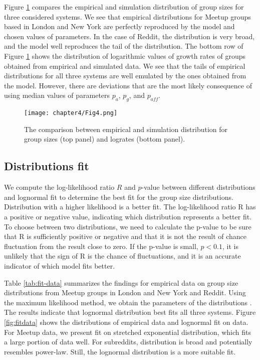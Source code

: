 Figure \ref{fig:fig6} compares the empirical and simulation distribution of group sizes for three considered systems. We see that empirical distributions for Meetup groups based in London and New York are perfectly reproduced by the model and chosen values of parameters. In the case of Reddit, the distribution is very broad, and the model well reproduces the tail of the distribution.
The bottom row of Figure \ref{fig:fig6} shows the distribution of logarithmic values of growth rates of groups obtained from empirical and simulated data. We see that the tails of empirical distributions for all three systems are well emulated by the ones obtained from the model. However, there are deviations that are the most likely consequence of using median values of parameters $p_{a}$, $p_{g}$, and $p_{aff}$.

\begin{figure}[H]
	\centering
	\texttt{[image: chapter4/Fig4.png]}
	\caption[The comparison between empirical and simulated data.]{The comparison between empirical and simulation distribution for group sizes (top panel) and logrates (bottom panel).}
	\label{fig:fig6}
\end{figure}


\subsection{Distributions fit}

We compute the log-likelihood ratio $R$ and $p$-value between different distributions and lognormal fit \cite{clauset2009power} to determine the best fit for the group size distributions. Distribution with a higher likelihood is a better fit. The log-likelihood ratio R has a positive or negative value, indicating which distribution represents a better fit. To choose between two distributions, we need to calculate the p-value to be sure that R is sufficiently positive or negative and that it is not the result of chance fluctuation from the result close to zero. If the p-value is small, $p<0.1$, it is unlikely that the sign of R is the chance of fluctuations, and it is an accurate indicator of which model fits better.

Table \ref{tab:fit-data} summarizes the findings for empirical data on group size distributions from Meetup groups in London and New York and Reddit. Using the maximum likelihood method, we obtain the parameters of the distributions \cite{clauset2009power}. The results indicate that lognormal distribution best fits all three systems. Figure \ref{fig:fitdata} shows the distributions of empirical data and lognormal fit on data. For Meetup data, we present fit on stretched exponential distribution, which fits a large portion of data well. For subreddits, distribution is broad and potentially resembles power-law. Still, the lognormal distribution is a more suitable fit.

